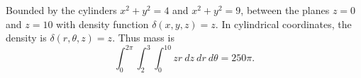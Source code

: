 {
Bounded by the cylinders $x^2+y^2=4$ and $x^2+y^2=9$, between the planes $z=0$ and $z=10$ with density function $\delta(x,y,z) =z$. 
}
{In cylindrical coordinates, the density is $\delta(r,\theta,z) = z$. Thus mass is
$$\int_0^{2\pi}\int_2^3\int_0^{10} zr\ dz\ dr\ d\theta = 250\pi.$$
}
